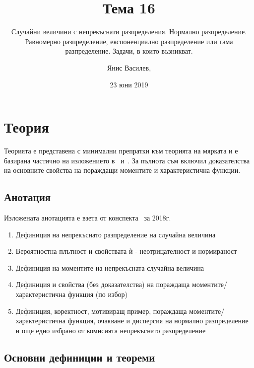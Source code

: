 \documentclass[numbers=endperiod, bibliography=totocnumbered]{scrartcl}
\title{Тема 16}
\subtitle{Случайни величини с непрекъснати разпределения. Нормално разпределение. Равномерно разпределение, експоненциално разпределение или гама разпределение. Задачи, в които възникват.}
\author{Янис Василев, \Email{ianis@ivasilev.net}}
\date{23 юни 2019}
\begin{document}
\maketitle

\section{Теория}

Теорията е представена с минимални препратки към теорията на мярката и е базирана частично на изложението в~\cite{Borovkov} и~\cite{DimitrovYanev}. За пълнота съм включил доказателства на основните свойства на пораждащи моментите и характеристична функции.

\subsection{Анотация}

Изложената анотацията е взета от конспекта~\cite{Syllabus} за 2018г.

\begin{enumerate}
  \item Дефиниция на непрекъснато разпределение на случайна величина
  \item Вероятностна плътност и свойствата ѝ - неотрицателност и нормираност
  \item Дефиниция на моментите на непрекъсната случайна величина
  \item Дефиниция и свойства (без доказателства) на пораждаща моментите/характеристична функция (по избор)
  \item Дефиниция, коректност, мотивиращ пример, пораждаща моментите/характеристична функция, очакване и дисперсия на нормално разпределение и още едно избрано от комисията непрекъснато разпределение
\end{enumerate}

\subsection{Основни дефиниции и теореми}
\end{document}
